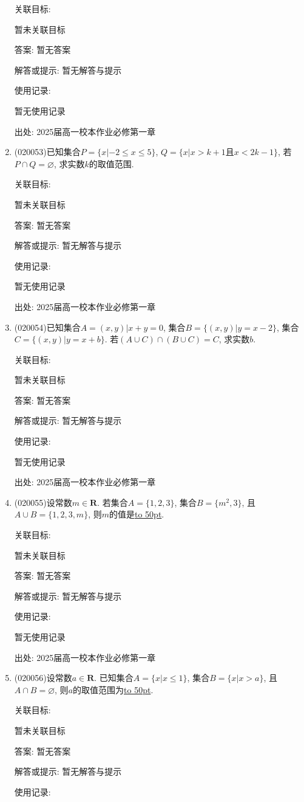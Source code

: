 \documentclass[10pt,a4paper]{article}
\newcommand{\blank}[1]{\underline{\hbox to #1pt{}}}
\begin{document}
\begin{enumerate}[1.]
关联目标:

暂未关联目标

答案: 暂无答案

解答或提示: 暂无解答与提示

使用记录:

暂无使用记录


出处: 2025届高一校本作业必修第一章
\item { (020053)}已知集合$P=\{ x|-2\le x\le 5\}$, $Q=\{x|x>k+1$且$x<2k-1\}$, 若$P\cap Q=\varnothing$, 求实数$k$的取值范围.


关联目标:

暂未关联目标

答案: 暂无答案

解答或提示: 暂无解答与提示

使用记录:

暂无使用记录


出处: 2025届高一校本作业必修第一章
\item { (020054)}已知集合$A={(x, y)|x+y=0}$, 集合$B=\{(x,y)|y=x-2\}$, 集合$C=\{(x,y)|y=x+b\}$. 若$(A\cup C)\cap(B\cup C)=C$, 求实数$b$.


关联目标:

暂未关联目标

答案: 暂无答案

解答或提示: 暂无解答与提示

使用记录:

暂无使用记录


出处: 2025届高一校本作业必修第一章
\item { (020055)}设常数$m\in \mathbf{R}$. 若集合$A=\{1,2,3\}$, 集合$B=\{m^2,3\}$, 且$A\cup B=\{1,2,3,m\}$, 则$m$的值是\blank{50}.


关联目标:

暂未关联目标

答案: 暂无答案

解答或提示: 暂无解答与提示

使用记录:

暂无使用记录


出处: 2025届高一校本作业必修第一章
\item { (020056)}设常数$a\in \mathbf{R}$. 已知集合$A=\{x| x\le 1\}$, 集合$B=\{x| x>a\}$, 且$A\cap B=\varnothing$, 则$a$的取值范围为\blank{50}.


关联目标:

暂未关联目标

答案: 暂无答案

解答或提示: 暂无解答与提示

使用记录:


\end{enumerate}
\end{document}
